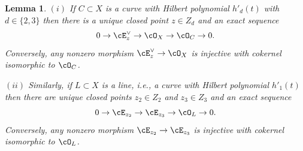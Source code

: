 \documentclass[11pt]{amsart}
\theoremstyle{plain}
\newtheorem{lemma}[theorem]{Lemma}
\theoremstyle{definition}
\theoremstyle{remark}
\begin{document}
\begin{lemma}\label{lemma:oc-decomposition}
$(i)$ If $C \subset X$ is a curve with Hilbert polynomial $h'_d(t)$ with $d \in \{2,3\}$ then there is a unique closed point $z \in Z_d$ and an exact sequence
\begin{equation*}
0 \to \cE_z^\vee \to \cO_X \to \cO_C \to 0.
\end{equation*}
Conversely, any nonzero morphism $\cE_z^\vee \to \cO_X$ is injective with cokernel isomorphic to $\cO_C$.

$(ii)$ Similarly, if $L \subset X$ is a line, i.e., a curve with Hilbert polynomial $h'_1(t)$ then there are unique closed points $z_2 \in Z_2$ and $z_3 \in Z_3$ and an exact sequence
\begin{equation*}
0 \to \cE_{z_2} \to \cE_{z_3} \to \cO_L \to 0.
\end{equation*}
Conversely, any nonzero morphism $\cE_{z_2} \to \cE_{z_3}$ is injective with cokernel isomorphic to $\cO_L$.
\end{lemma}
\end{document}
